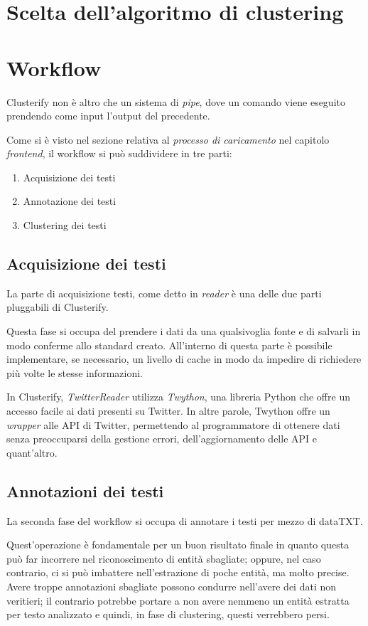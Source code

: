 \section{Scelta dell'algoritmo di clustering}
	

\section{Workflow}
	Clusterify non è altro che un sistema di \emph{pipe}, dove un comando viene eseguito prendendo come input l'output del precedente.

	Come si è visto nel sezione relativa al \emph{processo di caricamento} nel capitolo \emph{frontend}, il workflow si può suddividere in tre parti:

	\begin{enumerate}
  		\item Acquisizione dei testi
  		\item Annotazione dei testi
 		\item Clustering dei testi
	\end{enumerate} 
	
	\subsection{Acquisizione dei testi}
		La parte di acquisizione testi, come detto in \emph{reader} è una delle due parti pluggabili di Clusterify.

		Questa fase si occupa del prendere i dati da una qualsivoglia fonte e di salvarli in modo conferme allo standard creato. All'interno di questa parte è possibile implementare, se necessario, un livello di cache in modo da impedire di richiedere più volte le stesse informazioni.

		In Clusterify, \emph{TwitterReader} utilizza \emph{Twython}, una libreria Python che offre un accesso facile ai dati presenti su Twitter\cite{twython}. In altre parole, Twython offre un \emph{wrapper} alle API di Twitter, permettendo al programmatore di ottenere dati senza preoccuparsi della gestione errori, dell'aggiornamento delle API e quant'altro. 

	\subsection{Annotazioni dei testi}
		La seconda fase del workflow si occupa di annotare i testi per mezzo di dataTXT.
		
		Quest'operazione è fondamentale per un buon risultato finale in quanto questa può far incorrere nel riconoscimento di entità sbagliate; oppure, nel caso contrario, ci si può imbattere nell'estrazione di poche entità, ma molto precise. Avere troppe annotazioni sbagliate possono condurre nell'avere dei dati non veritieri; il contrario potrebbe portare a non avere nemmeno un entità estratta per testo analizzato e quindi, in fase di clustering, questi verrebbero persi.

